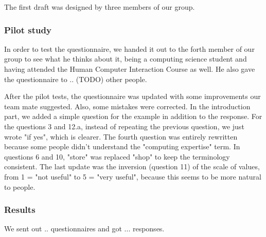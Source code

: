 The first draft was designed by three members of our group.

\subsubsection{Pilot study}
In order to test the questionnaire, we handed it out to the forth member of our group to see what he thinks about it, being a computing science student and having attended the Human Computer Interaction Course as well. He also gave the questionnaire to .. (TODO) other people.

After the pilot tests, the questionnaire was updated with some improvements our team mate suggested. Also, some mistakes were corrected. In the introduction part, we added a simple question for the example in addition to the response. For the questions 3 and 12.a, instead of repeating the previous question, we just wrote "if yes", which is clearer. The fourth question was entirely rewritten because some people didn't understand the "computing expertise" term. In questions 6 and 10, "store" was replaced "shop" to keep the terminology consistent. The last update was the inversion (question 11) of the scale of values, from 1 = "not useful" to 5 = "very useful", because this seems to be more natural to people.

\subsubsection{Results}
We sent out .. questionnaires and got ... responses.
